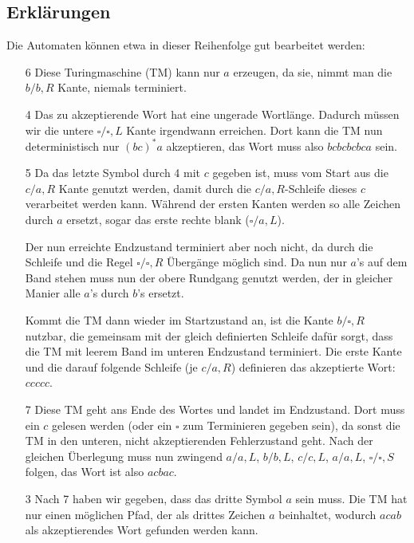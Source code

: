 \documentclass{article}
\begin{document}
\subsection*{Erklärungen}
Die Automaten können etwa in dieser Reihenfolge gut bearbeitet werden:
\begin{enumerate}
	\item[6] Diese Turingmaschine (TM) kann nur $a$ erzeugen, da sie, nimmt man die $b/b,R$ Kante, niemals terminiert.
  
	\item[4] Das zu akzeptierende Wort hat eine ungerade Wortlänge. Dadurch müssen wir die untere $\square/\square,L$ Kante irgendwann erreichen. Dort kann die TM nun deterministisch nur $(bc)^*a$ akzeptieren, das Wort muss also $bcbcbcbca$ sein.
  
	\item[5] Da das letzte Symbol durch 4 mit $c$ gegeben ist, muss vom Start aus die $c/a,R$ Kante genutzt werden, damit durch die $c/a,R$-Schleife dieses $c$ verarbeitet werden kann. Während der ersten Kanten werden so alle Zeichen durch $a$ ersetzt, sogar das erste rechte blank ($\square/a,L$). 
  
  Der nun erreichte Endzustand terminiert aber noch nicht, da durch die Schleife und die Regel $\square/\square,R$ Übergänge möglich sind. Da nun nur $a$'s auf dem Band stehen muss nun der obere Rundgang genutzt werden, der in gleicher Manier alle $a$'s durch $b$'s ersetzt. 
  
  Kommt die TM dann wieder im Startzustand an, ist die Kante $b/\square,R$ nutzbar, die gemeinsam mit der gleich definierten Schleife dafür sorgt, dass die TM mit leerem Band im unteren Endzustand terminiert. Die erste Kante und die darauf folgende Schleife (je $c/a,R$) definieren das akzeptierte Wort: $ccccc$.
  
	\item[7] Diese TM geht ans Ende des Wortes und landet im Endzustand. Dort muss ein $c$ gelesen werden (oder ein $\square$ zum Terminieren gegeben sein), da sonst die TM in den unteren, nicht akzeptierenden Fehlerzustand geht. Nach der gleichen Überlegung muss nun zwingend $a/a,L$, $b/b,L$, $c/c,L$, $a/a,L$, $\square/\square,S$ folgen, das Wort ist also $acbac$.
  
	\item[3] Nach 7 haben wir gegeben, dass das dritte Symbol $a$ sein muss. Die TM hat nur einen möglichen Pfad, der als drittes Zeichen $a$ beinhaltet, wodurch $acab$ als akzeptierendes Wort gefunden werden kann.
  

\end{enumerate}
\end{document}
